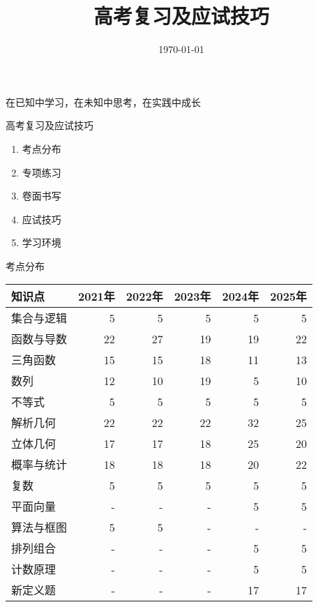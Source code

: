 \documentclass[aspectratio=169]{ctexbeamer} %
\date{\today}
\begin{document}
\begin{frame}{在已知中学习，在未知中思考，在实践中成长}
\title{高考复习及应试技巧}
\titlepage
\end{frame}

\begin{frame}[t]{高考复习及应试技巧}
\begin{enumerate}[label={\arabic*.}]
\item 考点分布
\item 专项练习
\item 卷面书写
\item 应试技巧
\item 学习环境
\end{enumerate}
\end{frame}

\begin{frame}[t]{考点分布}
\begin{longtable}{@{} l r r r r r @{}}
\toprule
知识点 & 2021年 & 2022年 & 2023年 & 2024年 & 2025年 \\
\midrule
集合与逻辑 & 5 & 5 & 5 & 5 & 5 \\
函数与导数 & 22 & 27 & 19 & 19 & 22 \\
三角函数 & 15 & 15 & 18 & 11 & 13 \\
数列 & 12 & 10 & 19 & 5 & 10 \\
不等式 & 5 & 5 & 5 & 5 & 5 \\
解析几何 & 22 & 22 & 22 & 32 & 25 \\
立体几何 & 17 & 17 & 18 & 25 & 20 \\
概率与统计 & 18 & 18 & 18 & 20 & 22 \\
复数 & 5 & 5 & 5 & 5 & 5 \\
平面向量 & - & - & - & 5 & 5 \\
算法与框图 & 5 & 5 & - & - & - \\
排列组合 & - & - & - & 5 & 5 \\
计数原理 & - & - & - & 5 & 5 \\
新定义题 & - & - & - & 17 & 17 \\
\bottomrule
\end{longtable}
\end{frame}
\end{document}
